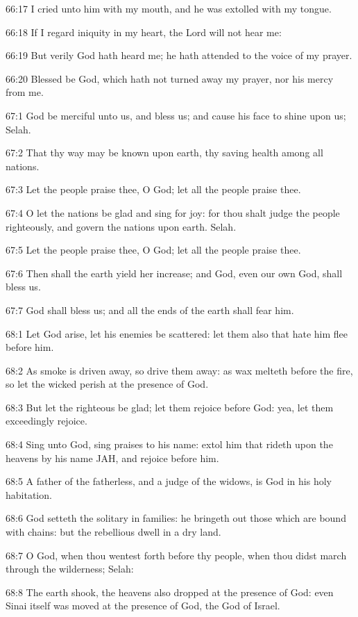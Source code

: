66:17 I cried unto him with my mouth, and he was extolled with my
tongue.

66:18 If I regard iniquity in my heart, the Lord will not hear me:

66:19 But verily God hath heard me; he hath attended to the voice of
my prayer.

66:20 Blessed be God, which hath not turned away my prayer, nor his
mercy from me.



67:1 God be merciful unto us, and bless us; and cause his face to
shine upon us; Selah.

67:2 That thy way may be known upon earth, thy saving health among all
nations.

67:3 Let the people praise thee, O God; let all the people praise
thee.

67:4 O let the nations be glad and sing for joy: for thou shalt judge
the people righteously, and govern the nations upon earth. Selah.

67:5 Let the people praise thee, O God; let all the people praise
thee.

67:6 Then shall the earth yield her increase; and God, even our own
God, shall bless us.

67:7 God shall bless us; and all the ends of the earth shall fear him.



68:1 Let God arise, let his enemies be scattered: let them also that
hate him flee before him.

68:2 As smoke is driven away, so drive them away: as wax melteth
before the fire, so let the wicked perish at the presence of God.

68:3 But let the righteous be glad; let them rejoice before God: yea,
let them exceedingly rejoice.

68:4 Sing unto God, sing praises to his name: extol him that rideth
upon the heavens by his name JAH, and rejoice before him.

68:5 A father of the fatherless, and a judge of the widows, is God in
his holy habitation.

68:6 God setteth the solitary in families: he bringeth out those which
are bound with chains: but the rebellious dwell in a dry land.

68:7 O God, when thou wentest forth before thy people, when thou didst
march through the wilderness; Selah:

68:8 The earth shook, the heavens also dropped at the presence of God:
even Sinai itself was moved at the presence of God, the God of Israel.

